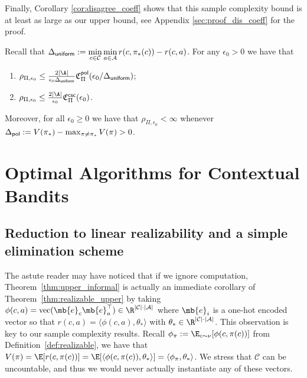 \documentclass{article}
\newcommand{\mc}[1]{\mathcal{#1}}
\newcommand{\lalit}[1]{\textcolor{blue}{}}
\newcommand{\1}{\mathbf{1}}
\renewcommand{\v}{r} %
\begin{document}
Finally, Corollary \ref{cor:disagree_coeff} shows that this sample complexity bound is at least as large as our upper bound, see Appendix \ref{sec:proof_dis_coeff} for the proof. 
\begin{corollary}\label{cor:disagree_coeff}
Recall that $\displaystyle\Delta_{\sf uniform} := \min_{c\in \mc{C}} \min_{a \in \mc{A}} \v(c,\pi_{\ast}(c)) - \v(c,a)$. 
For any $\epsilon_0 > 0$ we have that 
\begin{enumerate}
    \item $\rho_{\Pi, \epsilon_0}\leq \frac{2|\A|}{\epsilon_0\Delta_{\mathsf{uniform}}}\mathfrak{C}_{\Pi}^{\mathsf{pol}}(\epsilon_0/\Delta_{\mathsf{uniform}})$;
    \item $\rho_{\Pi, \epsilon_0}\leq \frac{2|\A|}{\epsilon_0}\mathfrak{C}_{\Pi}^{\mathsf{csc}}(\epsilon_0)$.
\end{enumerate}
Moreover, for all $\epsilon_0 \geq 0$ we have that $\rho_{\Pi, \epsilon_0} < \infty$ whenever $\Delta_{\sf pol} := V(\pi_{\ast}) - \max_{\pi \neq \pi_{\ast}}V(\pi) > 0$.
\end{corollary}

\section{Optimal Algorithms for Contextual Bandits}

\subsection{Reduction to linear realizability and a simple elimination scheme}\label{sec:reduction_to_linear}
The astute reader may have noticed that if we ignore computation, Theorem~\ref{thm:upper_informal} is actually an immediate corollary of Theorem~\ref{thm:realizable_upper} by taking $\phi(c,a) = \text{vec}(\mb{e}_c \mb{e}_a^\top) \in \R^{|\mc{C}|\cdot |\mc{A}|}$ where $\mb{e}_i$ is a one-hot encoded vector so that $\v(c,a) = \langle \phi(c,a), \theta_* \rangle$ with $\theta_* \in \R^{|\mc{C}|\cdot |\mc{A}|}$.
This observation is key to our sample complexity results.
Recall $\phi_\pi :=  \E_{c\sim \nu}[ \phi(c,\pi(c)) ]$ from Definition~\ref{def:realizable}, we have that $V(\pi) = \E[ \v(c,\pi(c)) ] = \E[ \langle \phi(c,\pi(c)), \theta_* \rangle ] = \langle \phi_\pi, \theta_* \rangle$.
We stress that $\mc{C}$ can be uncountable, and thus we would never actually instantiate any of these vectors.
\end{document}
